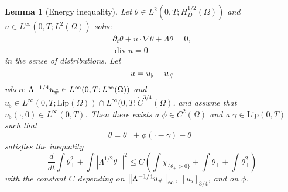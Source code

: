 \documentclass[11pt]{amsart}
\newtheorem{lemma}[theorem]{Lemma}
\theoremstyle{remark}
\newcommand{\norm}[1]{\left\lVert#1\right\rVert}
\newcommand{\paren}[1]{\left( #1 \right)}
\newcommand{\bracket}[1]{\left[ #1 \right]}
\newcommand{\abs}[1]{\left\lvert #1 \right\rvert}
\newcommand{\del}{\partial}
\newcommand{\grad}{\nabla}
\newcommand{\ddt}{\frac{d}{dt}}
\renewcommand{\div}{\operatorname{div}}
\newcommand{\Lip}{\text{Lip}}
\newcommand{\indic}[1]{\chi_{\{#1\}}}
\newcommand{\ulow}{u_\flat}
\newcommand{\uhigh}{u_{\scalebox{0.7}{\#}}}
\begin{document}
\begin{lemma}[Energy inequality]
Let $\theta \in L^2(0,T; H_D^{1/2}(\Omega))$ and $u \in L^\infty(0,T; L^2(\Omega))$ solve
\begin{align*}
\del_t \theta + u\cdot \grad \theta + \Lambda \theta = 0,
\\ \div u = 0
\end{align*}
in the sense of distributions.  Let
\[ u = \ulow + \uhigh \]
where $\Lambda^{-1/4} \uhigh \in L^\infty(0,T; L^\infty(\Omega))$ and $\ulow \in L^\infty(0,T; \Lip(\Omega)) \cap L^\infty(0,T; \dot{C}^{3/4}(\Omega)$, and assume that $\ulow(\cdot,0) \in L^\infty(0,T)$.  
Then there exists a $\phi \in C^2(\Omega)$ and a $\gamma \in \Lip(0,T)$ such that
\[ \theta = \theta_+ + \phi(\cdot-\gamma) - \theta_- \]
satisfies the inequality
\[ \ddt \int \theta_+^2 + \int \abs{\Lambda^{1/2} \theta_+}^2 \leq C \paren{ \int \indic{\theta_+ > 0} + \int \theta_+ + \int \theta_+^2 } \]
with the constant $C$ depending on $\norm{\Lambda^{-1/4} \uhigh}_\infty$, $\bracket{\ulow}_{3/4}$, and on $\phi$.  
\end{lemma}
\end{document}
